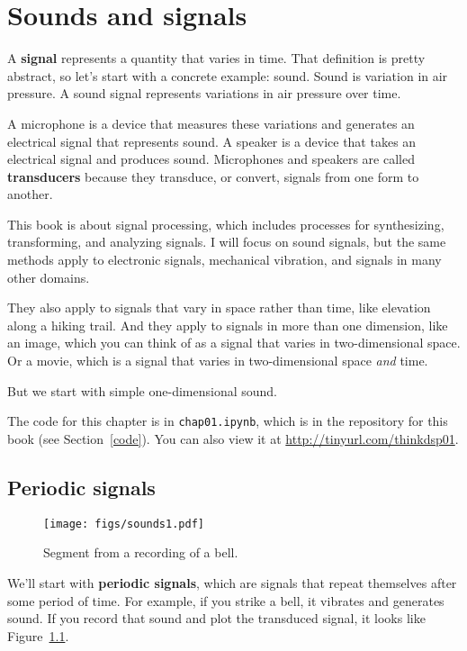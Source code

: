 \chapter{Sounds and signals}
\label{sounds}

A {\bf signal} represents a quantity that varies in time.  That
definition is pretty abstract, so let's start with a concrete example:
sound.  Sound is variation in air pressure.  A sound signal represents
variations in air pressure over time.

A microphone is a device that measures these variations and generates
an electrical signal that represents sound.  A speaker is a device
that takes an electrical signal and produces sound.
Microphones and speakers are called {\bf transducers} because they
transduce, or convert, signals from one form to another.

This book is about signal processing, which includes processes for
synthesizing, transforming, and analyzing signals.  I will focus on
sound signals, but the same methods apply to electronic signals,
mechanical vibration, and signals in many other domains.

They also apply to signals that vary in space rather than time, like
elevation along a hiking trail.  And they apply to signals in more
than one dimension, like an image, which you can think of as a signal
that varies in two-dimensional space.  Or a movie, which is
a signal that varies in two-dimensional space {\it and} time.

But we start with simple one-dimensional sound.

The code for this chapter is in {\tt chap01.ipynb}, which is in the
repository for this book (see Section~\ref{code}).
You can also view it at \url{http://tinyurl.com/thinkdsp01}.


\section{Periodic signals}
\label{violin}

\begin{figure}
	\centerline{\texttt{[image: figs/sounds1.pdf]}}
	\caption{Segment from a recording of a bell.}
	\label{fig.sounds1}
\end{figure}

We'll start with {\bf periodic signals}, which are signals that
repeat themselves after some period of time.  For example, if you
strike a bell, it vibrates and generates sound.  If you record
that sound and plot the transduced signal, it looks like
Figure~\ref{fig.sounds1}.

